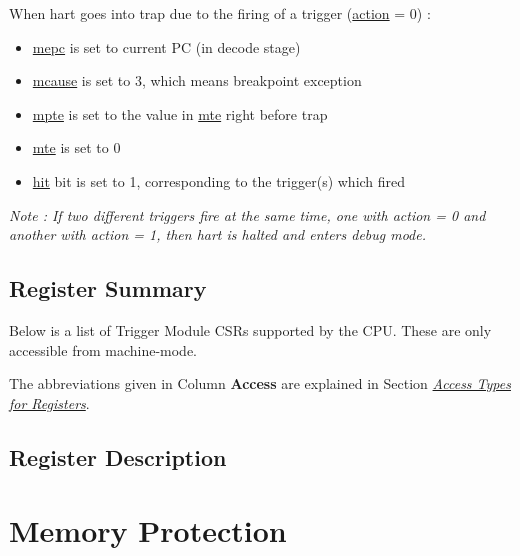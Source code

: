 \documentclass[main\_\_EN.tex]{subfiles}
\begin{document}
When hart goes into trap due to the firing of a trigger (\hyperref[fielddesc:MCONTROLACTION]{action} = 0) :
\begin{itemize}
    \item \hyperref[regdesc:MEPC]{mepc} is set to current PC (in decode stage)
    \item \hyperref[regdesc:MCAUSE]{mcause} is set to 3, which means breakpoint exception
    \item \hyperref[fielddesc:TCONTROLMPTE]{mpte} is set to the value in \hyperref[fielddesc:TCONTROLMTE]{mte} right before trap
    \item \hyperref[fielddesc:TCONTROLMTE]{mte} is set to 0
    \item \hyperref[fielddesc:MCONTROLHIT]{hit} bit is set to 1, corresponding to the trigger(s) which fired
\end{itemize}

\textit{Note : If two different triggers fire at the same time, one with action = 0 and another with action = 1, then hart is halted and enters debug mode.}


\hypertarget{riscvcpu-hwt-reg-summ}{}
\subsection{Register Summary}
\label{sec:riscvcpu-hwt-reg-summ}


Below is a list of Trigger Module CSRs supported by the CPU. These are only accessible from machine-mode.

The abbreviations given in Column \textbf{Access} are explained in Section \hyperref[glossary-access-types]{\textit{Access Types for Registers}}.




\subsection{Register Description}




\clearpage
\section{Memory Protection}
\label{sec:riscvcpu-pmp}
\end{document}
